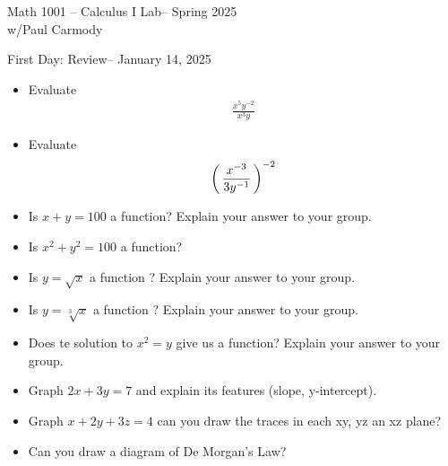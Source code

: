 \documentclass[10pt,a4paper]{report}
\newcommand{\CLASSNAME}{Math 1001 -- Calculus I Lab}
\newcommand{\PROFESSOR}{Paul Carmody}
\newcommand{\STUDENTNAME}{Paul Carmody}
\newcommand{\ASSIGNMENT}{First Day: Review}
\newcommand{\DUEDATE}{January 14, 2025}
\newcommand{\SEMESTER}{Spring 2025}
\begin{document}
\begin{center}
	\Large{\CLASSNAME -- \SEMESTER} \\
	\large{w/\PROFESSOR}
\end{center}
\begin{center}
	\ASSIGNMENT -- \DUEDATE\\
\end{center}


\begin{itemize}
	\item Evaluate \begin{align*}
	\frac{x^5y^{-2}}{x^3y} 
\end{align*}
	\item Evaluate \begin{align*}
	\left (\, \frac{x^{-3}}{3y^{-1}}  \,\right )^{-2}
	\end{align*}
	\item Is $x+y= 100$ a function?  Explain your answer to your group. \\
	\item Is $x^2 + y^2 = 100$ a function? \\
	\item Is $y=\sqrt{x}$ a function ?  Explain your answer to your group. \\
	\item Is $y=\sqrt[3]{x}$ a function ?  Explain your answer to your group. \\
	\item Does te solution to $x^2 = y$ give us a function?  Explain your answer to your group. \\
	\item Graph $2x + 3y = 7$ and explain its features (slope, y-intercept).\\
	\item Graph $x + 2y + 3z = 4$ can you draw the traces in each xy, yz an xz plane? \\
	\item Can you draw a diagram of De Morgan's Law?  
\end{itemize}
\end{document}
